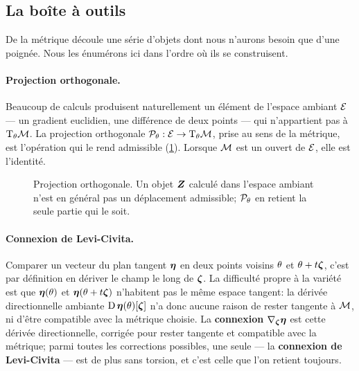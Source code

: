 \subsection{La boîte à outils}

De la métrique découle une série d'objets dont nous n'aurons besoin que d'une poignée. Nous les énumérons ici dans l'ordre où ils se construisent.

\paragraph{Projection orthogonale.} Beaucoup de calculs produisent naturellement un élément de l'espace ambiant $\mathcal{E}$ --- un gradient euclidien, une différence de deux points --- qui n'appartient pas à $\mathrm{T}_{\theta}\mathcal{M}$. La projection orthogonale $\mathcal{P}_\theta:\mathcal{E}\to\mathrm{T}_{\theta}\mathcal{M}$, prise au sens de la métrique, est l'opération qui le rend admissible (\cref{fig:context-riemann-projection}). Lorsque $\mathcal{M}$ est un ouvert de $\mathcal{E}$, elle est l'identité.

\begin{figure}[htb]
  \centering
  
  \caption{Projection orthogonale. Un objet $\boldsymbol{Z}$ calculé dans l'espace
    ambiant n'est en général pas un déplacement admissible; $\mathcal{P}_\theta$ en
    retient la seule partie qui le soit.}
  \label{fig:context-riemann-projection}
\end{figure}

\paragraph{Connexion de Levi-Civita.} Comparer un vecteur du plan tangent $\boldsymbol{\eta}$ en deux points voisins $\theta$ et $\theta+t\boldsymbol{\zeta}$, c'est par définition en dériver le champ le long de $\boldsymbol{\zeta}$. La difficulté propre à la variété est que $\boldsymbol{\eta}(\theta)$ et $\boldsymbol{\eta}(\theta+t\boldsymbol{\zeta})$ n'habitent pas le même espace tangent: la dérivée directionnelle ambiante $\operatorname{\mathrm{D}}\boldsymbol{\eta}(\theta)[\boldsymbol{\zeta}]$ n'a donc aucune raison de rester tangente à $\mathcal{M}$, ni d'être compatible avec la métrique choisie. La \textbf{connexion} $\nabla_{\boldsymbol{\zeta}}\boldsymbol{\eta}$ est cette dérivée directionnelle, corrigée pour rester tangente et compatible avec la métrique; parmi toutes les corrections possibles, une seule --- la \textbf{connexion de Levi-Civita} --- est de plus sans torsion, et c'est celle que l'on retient toujours. \\

